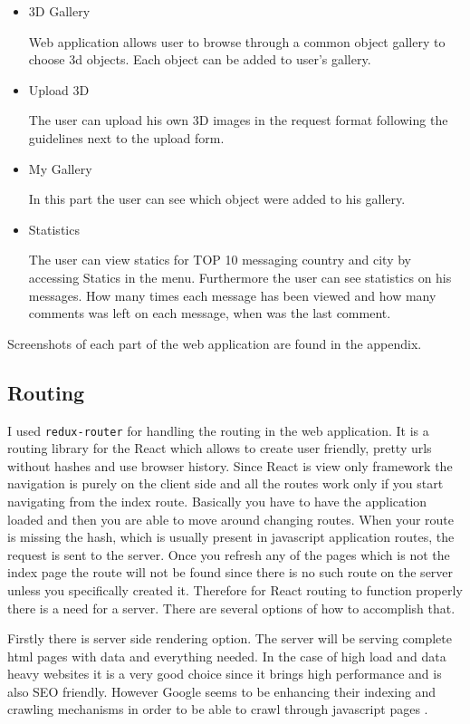 \documentclass[thesis=M,english]{FITthesis}[2012/10/20]
\begin{document}
\begin{itemize}
\item 3D Gallery

Web application allows user to browse through a common object gallery to choose 3d objects. Each object can be added to user's gallery.

\item Upload 3D 

The user can upload his own 3D images in the request format following the guidelines next to the upload form.

\item My Gallery

In this part the user can see which object were added to his gallery.

\item Statistics

The user can view statics for TOP 10 messaging country and city by accessing Statics in the menu. Furthermore the user can see statistics on his messages. How many times each message has been viewed and how many comments was left on each message, when was the last comment.
\end{itemize}

Screenshots of each part of the web application are found in the appendix.
\subsection{Routing}

I used \verb|redux-router| \cite{react-router} for handling the routing in the web application. It is a routing library for the React which allows to create user friendly, pretty urls without hashes and use browser history.  Since React is view only framework the navigation is purely on the client side and all the routes work only if you start navigating from the index route. Basically you have to have the application loaded and then you are able to move around changing routes. When your route is missing the hash, which is usually present in javascript application routes, the request is sent to the server. Once you refresh any of the pages which is not the index page the route will not be found since there is no such route on the server unless you specifically created it. Therefore for React routing to function properly there is a need for a server. There are several options of how to accomplish that. 

Firstly there is server side rendering option. The server will be serving complete html pages with data and everything needed. In the case of high load and data heavy websites it is a very good choice since it brings high performance and is also SEO friendly. However Google seems to be enhancing their indexing and crawling mechanisms in order to be able to crawl through javascript pages \cite{google-blog}. 
\end{document}
